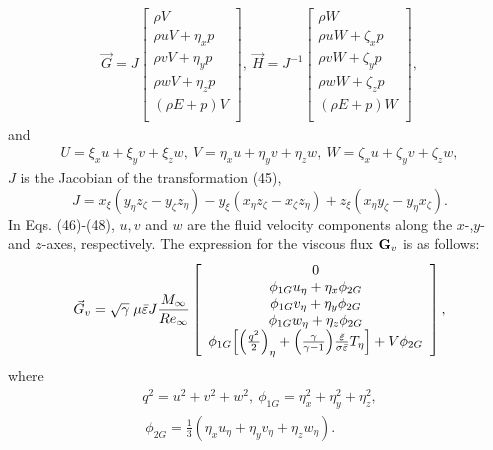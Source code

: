 \begin{eqnarray}
\vec{G} = J \left[ \begin{array}{c}
\rho V\\
\rho uV+\eta_x p\\
\rho vV+\eta_y p\\
\rho wV+\eta_z p\\
(\rho E+p)V\\
\end{array} \right ],~\vec{H} = J^{-1} \left[ \begin{array}{c}
\rho W\\
\rho uW + \zeta_x p\\
\rho vW + \zeta_y p\\
\rho wW + \zeta_z p\\
(\rho E + p)W\\
\end{array} \right ],
\end{eqnarray}
and
\begin{eqnarray}
U=\xi_x u+\xi_y v+\xi_z w,~V=\eta_x u+\eta_y v+\eta_z w,~W=\zeta_x u
+\zeta_y v +\zeta_z w,
\end{eqnarray}
$J$ is the Jacobian of the transformation (45),
\begin{equation}
J=x_{\xi}(y_{\eta}z_{\zeta} - y_{\zeta}z_{\eta})- y_{\xi}(x_{\eta}
z_{\zeta} - x_{\zeta}z_{\eta}) + z_{\xi}(x_{\eta}y_{\zeta}-y_{\eta}x_{\zeta}).
\end{equation}
In Eqs. (46)-(48), $u,v$ and $w$ are the fluid velocity components along the
$x$-,$y$- and $z$-axes, respectively. The expression for the viscous flux
${\bf G}_v$ is as follows:
\begin{eqnarray}
\vec{G}_v = \sqrt{\gamma}\;\mu \bar{\varepsilon}J
\frac{M_{\infty}}{Re_{\infty}}
\left[ \begin{array}{c}
0\\
\phi_{1G} u_{\eta}+\eta_x \phi_{2G}\\
\phi_{1G}v_{\eta}+\eta_y \phi_{2G}\\
\phi_{1G} w_{\eta}+\eta_z \phi_{2G}\\
\phi_{1G}\Bigl[\Bigl(\frac{q^2}{2}\Bigr)_{\eta} + \Bigl(\frac{\gamma}{\gamma-1}
\Bigr)\frac{\tilde{\varepsilon}}{\sigma \bar{\varepsilon}}T_{\eta}\Bigr]
+ V\phi_{2G}\\
\end{array} \right ],
\end{eqnarray}
where
\begin{eqnarray*}
q^2=u^2+v^2+w^2,~
\phi_{1G} = \eta_x^2+\eta_y^2+\eta_z^2,
\nonumber\\
~\phi_{2G} =\frac{1}{3}(\eta_xu_{\eta}+\eta_yv_{\eta}+\eta_zw_{\eta}).
\end{eqnarray*}
